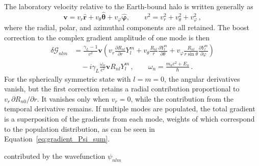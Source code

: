The laboratory velocity relative to the Earth-bound halo is written generally as
\begin{equation}
    \mathbf{v}
    =
    v_r\hat{\mathbf{r}}
    +v_\theta\hat{\boldsymbol{\theta}}
    +v_\varphi\hat{\boldsymbol{\varphi}},
    \qquad
    v^2=v_r^2+v_\theta^2+v_\varphi^2
    \,,
\end{equation}
where the radial, polar, and azimuthal components are all retained.
The boost correction to the complex gradient amplitude of one mode is then
\begin{equation}
    \begin{aligned}
        \delta\boldsymbol{\mathcal{G}}_{nlm}
        &=
        \frac{\gamma_L-1}{v^2}\mathbf{v}
        \left(
        v_r\frac{\partial R_{nl}}{\partial r}Y_l^m
        +v_\theta\frac{R_{nl}}{r}\frac{\partial Y_l^m}{\partial\theta}
        +v_\varphi\frac{R_{nl}}{r\sin\theta}\frac{\partial Y_l^m}{\partial\varphi}
        \right)
        \\
        &\quad
        -i\gamma_L\frac{\omega_n}{c^2}
        \mathbf{v}R_{nl}Y_l^m
        \,,
        \qquad
        \omega_n=\frac{m_a c^2+E_n}{\hbar}
        \,.
    \end{aligned}
    \label{eq:gradient_boost_mode}
\end{equation}
For the spherically symmetric state with $l=m=0$, the angular derivatives vanish, but the first correction retains a radial contribution proportional to $v_r\,\partial R_{n0}/\partial r$.
It vanishes only when $v_r=0$, while the contribution from the temporal derivative remains.
If multiple modes are populated, the total gradient is a superposition of the gradients from each mode, weights of which correspond to the population distribution, as can be seen in Equation~\eqref{eq:gradient_Psi_sum}.

contributed by the wavefunction $\psi_{nlm}$

